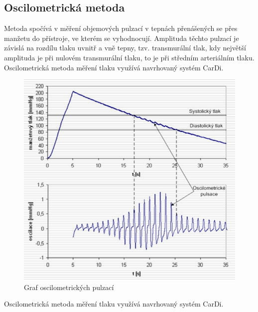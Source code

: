 \subsection{Oscilometrická metoda}
Metoda spočívá v měření objemových pulzací v tepnách přenášených se přes manžetu do přístroje, ve kterém se vyhodnocují.
Amplituda těchto pulzací je závislá na rozdílu tlaku uvnitř a vně tepny, tzv. transmurální tlak, kdy největší amplituda je při nulovém transmurální tlaku, to je při středním arteriálním tlaku.
\cite{cite:Fabian} Oscilometrická metoda měření tlaku využívá navrhovaný systém CarDi.
\begin{figure}[H]
    \caption{Graf oscilometrických pulzací \cite{cite:Fabian}}
    \includegraphics[width=1\textwidth]{pictures/oscilometricky_tlak.jpg}
\end{figure}
Oscilometrická metoda měření tlaku využívá navrhovaný systém CarDi.
\raggedbottom
